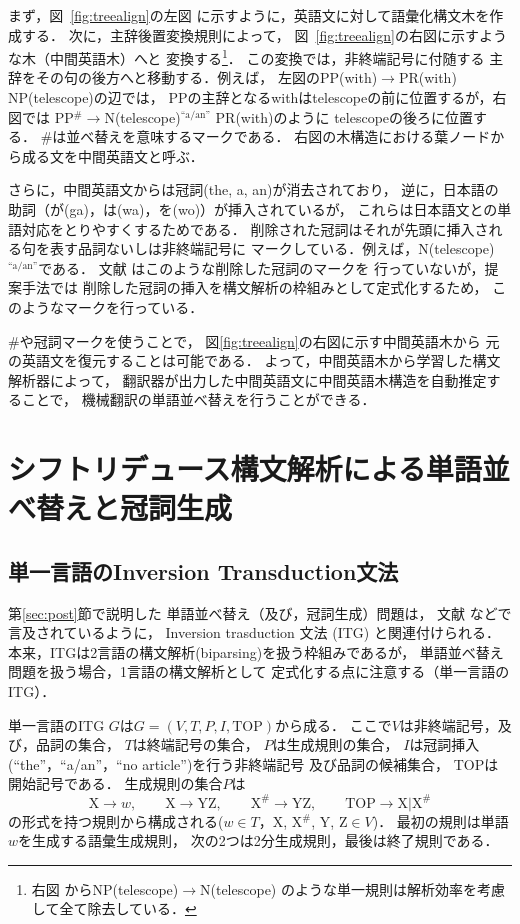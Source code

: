 \documentclass[japanese]{jnlp_1.4}
\begin{document}
まず，図~\ref{fig:treealign}の左図
に示すように，英語文に対して語彙化構文木を作成する．
次に，主辞後置変換規則によって，
図~\ref{fig:treealign}の右図に示すような木（中間英語木）へと
変換する\footnote{右図
からNP(telescope)$\rightarrow$N(telescope)
のような単一規則は解析効率を考慮して全て除去している．}．
この変換では，非終端記号に付随する
主辞をその句の後方へと移動する．例えば，
左図のPP(with)$\rightarrow$PR(with) NP(telescope)の辺では，
PPの主辞となるwithはtelescopeの前に位置するが，右図では
PP$^{\#}$$\rightarrow$N(telescope)$^{\text{``a/an''}}$ PR(with)のように
telescopeの後ろに位置する．
\#は並べ替えを意味するマークである．
右図の木構造における葉ノードから成る文を中間英語文と呼ぶ．

さらに，中間英語文からは冠詞(the, a, an)が消去されており，
逆に，日本語の助詞（が(ga)，は(wa)，を(wo)）が挿入されているが，
これらは日本語文との単語対応をとりやすくするためである．
削除された冠詞はそれが先頭に挿入される句を表す品詞ないしは非終端記号に
マークしている．例えば，N(telescope)$^{\text{``a/an''}}$である．
文献 \cite{Goto:12}はこのような削除した冠詞のマークを
行っていないが，提案手法では
削除した冠詞の挿入を構文解析の枠組みとして定式化するため，
このようなマークを行っている．

\#や冠詞マークを使うことで，
図\ref{fig:treealign}の右図に示す中間英語木から
元の英語文を復元することは可能である．
よって，中間英語木から学習した構文解析器によって，
翻訳器が出力した中間英語文に中間英語木構造を自動推定することで，
機械翻訳の単語並べ替えを行うことができる．



\section{シフトリデュース構文解析による単語並べ替えと冠詞生成}

\subsection{単一言語のInversion Transduction文法}

第\ref{sec:post}節で説明した
単語並べ替え（及び，冠詞生成）問題は，
文献 \cite{Tromble:09,DeNero:11}などで言及されているように，
Inversion trasduction 文法 (ITG) \cite{Wu:97}と関連付けられる．
本来，ITGは2言語の構文解析(biparsing)を扱う枠組みであるが，
単語並べ替え問題を扱う場合，1言語の構文解析として
定式化する点に注意する（単一言語のITG）．

単一言語のITG $G$は$G=(V,T,P,I,\text{TOP})$から成る．
ここで$V$は非終端記号，及び，品詞の集合，
$T$は終端記号の集合，
$P$は生成規則の集合，
$I$は冠詞挿入(``the''，``a/an''，``no article'')を行う非終端記号
及び品詞の候補集合，
TOPは開始記号である．
生成規則の集合$P$は
\[
\text{X}\rightarrow w, \qquad
\text{X}\rightarrow \text{Y}\text{Z}, \qquad 
\text{X}^{\#}\rightarrow \text{Y}\text{Z}, \qquad 
\text{TOP}\rightarrow \text{X} | \text{X}^{\#}
\]
の形式を持つ規則から構成される($w\in T$，X, X$^{\#}$, Y, Z$\in V$)．
最初の規則は単語$w$を生成する語彙生成規則，
次の2つは2分生成規則，最後は終了規則である．
\end{document}
